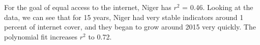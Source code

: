 \documentclass[reprint, onecolumn, amsmath, amssymb, showpacs, superscriptaddress, aps, prl]{revtex4-2}
\begin{document}
\begin{figure}[h!]%
    \centering
    \qquad
    \label{fig:example}%
\end{figure}

For the goal of equal access to the internet, Niger has \(r^2\) = 0.46. Looking at the data, we can see that for 15 years, Niger had very stable indicators around 1 percent of internet cover, and they began to grow around 2015 very quickly. The polynomial fit increases \(r^2\) to 0.72. 
\end{document}
